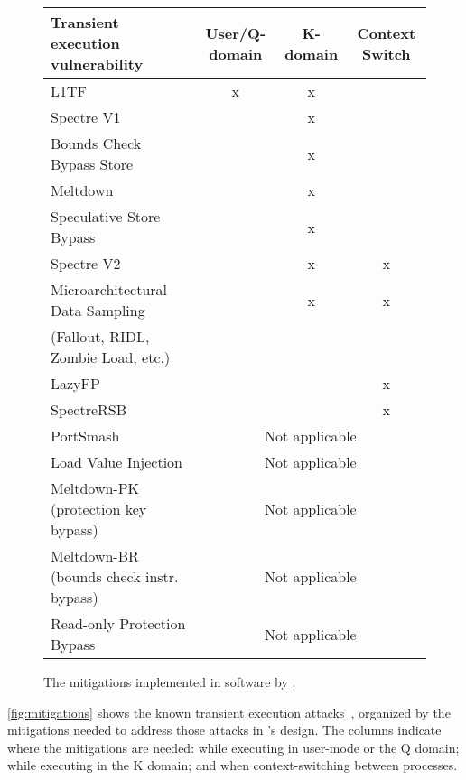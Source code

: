 \begin{figure}
\centering
\small
\begin{tabular}{lccc}
{\bf Transient execution vulnerability} & {\bf User/Q-domain} & {\bf K-domain} & {\bf Context Switch} \\

\midrule
L1TF & x & x & \\

\midrule
Spectre V1 & & x & \\
Bounds Check Bypass Store & & x &\\
Meltdown && x &\\
Speculative Store Bypass &	 & x &  \\

\midrule
Spectre V2 & & x & x \\
Microarchitectural Data Sampling && x & x\\
\qquad (Fallout, RIDL, Zombie Load, etc.) \\

\midrule

LazyFP &&& x \\
SpectreRSB &&& x\\

\midrule
PortSmash & \multicolumn{3}{c}{Not applicable} \\
Load Value Injection & \multicolumn{3}{c}{Not applicable} \\
Meltdown-PK (protection key bypass) & \multicolumn{3}{c}{Not applicable} \\
Meltdown-BR (bounds check instr. bypass) & \multicolumn{3}{c}{Not applicable} \\
Read-only Protection Bypass & \multicolumn{3}{c}{Not applicable} \\

\end{tabular}
\caption{The mitigations implemented in software by \sys{}.}
\label{fig:mitigations}
\end{figure}

\autoref{fig:mitigations} shows the known transient execution
attacks~\cite{hill:survey,sok:transient}, organized by the mitigations
needed to address those attacks in \sys's design.  The columns indicate where the mitigations are needed: while
executing in user-mode or the Q domain; while executing in the K domain;
and when context-switching between processes.



